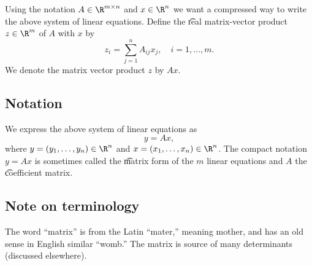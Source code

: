 Using the notation $A \in \R ^{m \times  n}$ and $x \in \R ^n$ we want a compressed way to write the above system of linear equations.
Define the \t{real matrix-vector product} $z \in \R ^m$ of $A$ with $x$ by
\[
z_{i} = \sum_{j = 1}^{n} A_{ij}x_j, \quad i = 1, \dots , m.
\]
We denote the matrix vector product $z$ by $Ax$.

\subsection*{Notation}

We express the above system of linear equations as
\[
y = Ax,
\]
where $y = (y_1, \dots , y_n) \in \R ^{n}$ and $x = (x_1, \dots , x_n) \in \R ^n$.
The compact notation $y = Ax$ is sometimes called the \t{matrix form} of the $m$ linear equations and $A$ the \t{coefficient matrix}.

\subsection*{Note on terminology}

The word ``matrix'' is from the Latin ``mater,'' meaning mother, and has an old sense in English similar ``womb.''
The matrix is source of many determinants (discussed elsewhere).
